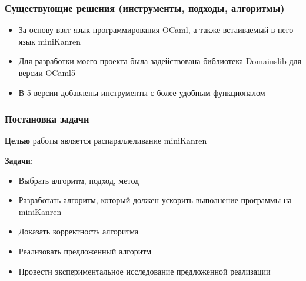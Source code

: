 \documentclass{beamer}
\begin{document}
\begin{frame}
  \frametitle{Существующие решения (инструменты, подходы, алгоритмы)}
  \begin{itemize}
    \item За основу взят язык программирования OCaml, а также встаиваемый в него язык miniKanren
    \item Для разработки моего проекта была задействована библиотека Domainslib для версии OCaml5
    \item В 5 версии добавлены инструменты с более удобным функционалом
  \end{itemize}

\end{frame}



\begin{frame}
  \frametitle{Постановка задачи}
  \textbf{Целью} работы является распараллеливание miniKanren %

  \textbf{Задачи}:
  \begin{itemize}
    \item Выбрать алгоритм, подход, метод %
    \item Разработать алгоритм, который должен ускорить выполнение программы на miniKanren
    \item Доказать корректность алгоритма
    \item Реализовать предложенный алгоритм
    \item Провести экспериментальное исследование предложенной реализации
  \end{itemize}
\end{frame}
\end{document}
